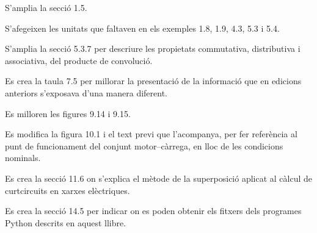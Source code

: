 S'amplia la secció 1.5.

S'afegeixen les unitats que faltaven en els exemples 1.8, 1.9, 4.3, 5.3 i 5.4.

S'amplia la secció 5.3.7 per descriure les propietats commutativa, distributiva i associativa, del producte de convolució.

Es crea la taula 7.5 per millorar la presentació de la informació que en edicions anteriors s'exposava d'una manera diferent.

Es milloren les figures 9.14 i 9.15.

Es modifica la figura 10.1 i el text previ que l'acompanya, per fer referència al punt de funcionament del conjunt motor--càrrega, en lloc de  les condicions nominals.


Es crea la secció 11.6 on s'explica el mètode de la superposició aplicat al càlcul de curtcircuits en xarxes elèctriques.

Es crea la secció 14.5 per indicar on es poden obtenir els fitxers dels programes Python descrits en aquest llibre.

